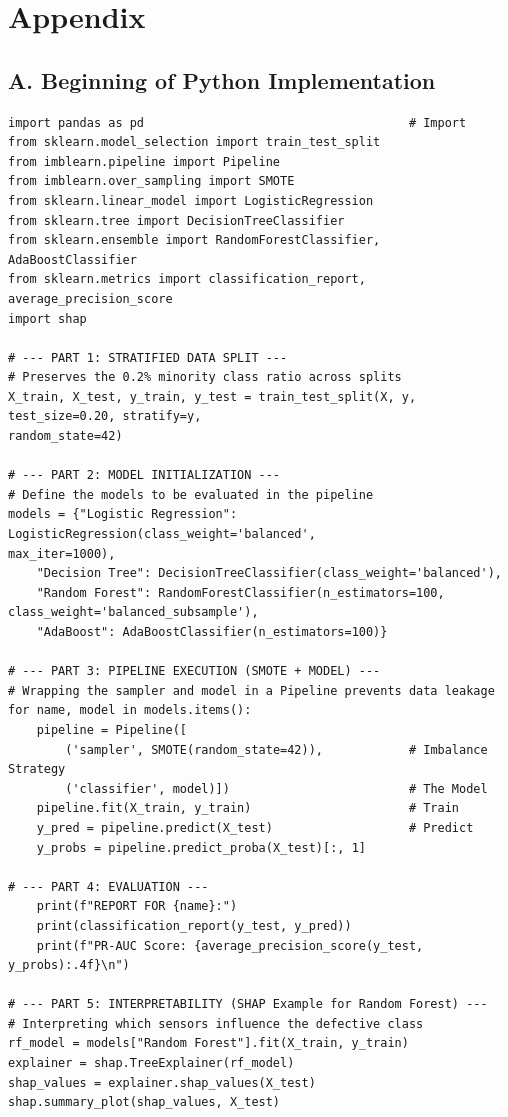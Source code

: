 \documentclass{article}
\begin{document}
\newpage
\section*{Appendix}
\subsection*{A. Beginning of Python Implementation}
\begin{small}
\begin{verbatim}
import pandas as pd                                     # Import
from sklearn.model_selection import train_test_split
from imblearn.pipeline import Pipeline
from imblearn.over_sampling import SMOTE
from sklearn.linear_model import LogisticRegression
from sklearn.tree import DecisionTreeClassifier
from sklearn.ensemble import RandomForestClassifier, AdaBoostClassifier
from sklearn.metrics import classification_report, average_precision_score
import shap

# --- PART 1: STRATIFIED DATA SPLIT ---
# Preserves the 0.2% minority class ratio across splits
X_train, X_test, y_train, y_test = train_test_split(X, y, test_size=0.20, stratify=y, 
random_state=42)

# --- PART 2: MODEL INITIALIZATION ---
# Define the models to be evaluated in the pipeline
models = {"Logistic Regression": LogisticRegression(class_weight='balanced', 
max_iter=1000),
    "Decision Tree": DecisionTreeClassifier(class_weight='balanced'),
    "Random Forest": RandomForestClassifier(n_estimators=100, 
class_weight='balanced_subsample'),
    "AdaBoost": AdaBoostClassifier(n_estimators=100)}

# --- PART 3: PIPELINE EXECUTION (SMOTE + MODEL) ---
# Wrapping the sampler and model in a Pipeline prevents data leakage
for name, model in models.items():
    pipeline = Pipeline([
        ('sampler', SMOTE(random_state=42)),            # Imbalance Strategy
        ('classifier', model)])                         # The Model
    pipeline.fit(X_train, y_train)                      # Train
    y_pred = pipeline.predict(X_test)                   # Predict
    y_probs = pipeline.predict_proba(X_test)[:, 1]

# --- PART 4: EVALUATION ---
    print(f"REPORT FOR {name}:")
    print(classification_report(y_test, y_pred))
    print(f"PR-AUC Score: {average_precision_score(y_test, y_probs):.4f}\n")

# --- PART 5: INTERPRETABILITY (SHAP Example for Random Forest) ---
# Interpreting which sensors influence the defective class
rf_model = models["Random Forest"].fit(X_train, y_train)
explainer = shap.TreeExplainer(rf_model)
shap_values = explainer.shap_values(X_test)
shap.summary_plot(shap_values, X_test)
\end{verbatim}
\end{small}
\end{document}
